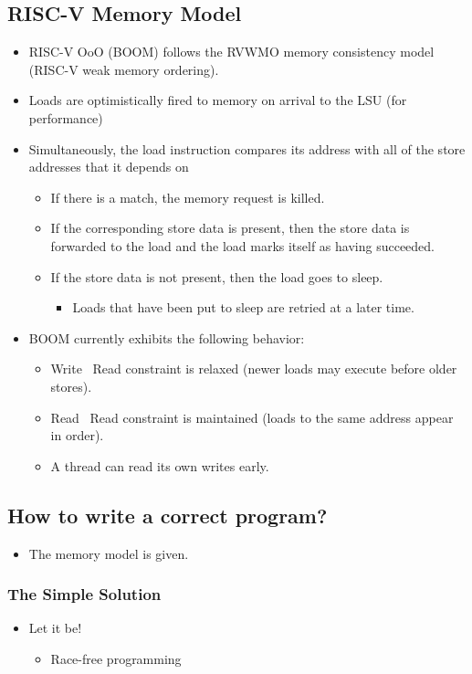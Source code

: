\documentclass[10pt]{article}
\begin{document}
\subsection*{RISC-V Memory Model}
\begin{itemize}
    \item RISC-V OoO (BOOM) follows the RVWMO memory consistency model (RISC-V weak memory ordering).
    \item Loads are optimistically fired to memory on arrival to the LSU (for performance)
    \item Simultaneously, the load instruction compares its address with all of the store addresses that it depends on
    \begin{itemize}
        \item If there is a match, the memory request is killed.
        \item If the corresponding store data is present, then the store data is forwarded to the load and the load marks itself as having succeeded.
        \item If the store data is not present, then the load goes to sleep.
        \begin{itemize}
            \item Loads that have been put to sleep are retried at a later time.
        \end{itemize}
    \end{itemize}
    \item BOOM currently exhibits the following behavior:
    \begin{itemize}
        \item Write \textrightarrow~Read constraint is relaxed (newer loads may execute before older stores).
        \item Read \textrightarrow~Read constraint is maintained (loads to the same address appear in order).
        \item A thread can read its own writes early.
    \end{itemize}
\end{itemize}
\subsection*{How to write a correct program?}
\begin{itemize}
    \item The memory model is given.
\end{itemize}
\subsubsection*{The Simple Solution}
\begin{itemize}
    \item Let it be!
    \begin{itemize}
        \item Race-free programming
    \end{itemize}
\end{itemize}
\end{document}
